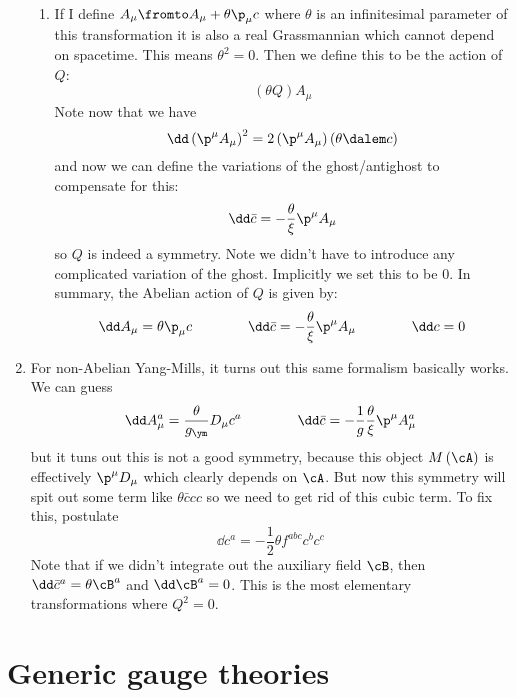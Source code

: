 \documentclass{booc}
\begin{document}
\begin{enumerate}
\begin{enumerate}
\item If I define $A_\mu \fromto A_\mu + \theta \p_\mu c$
where $\theta$ is an infinitesimal parameter of this transformation
it is also a real Grassmannian which cannot depend on spacetime. 
This means $\theta^2 = 0$.
Then we define this to be the action of $Q$:
\begin{equation}
\left( \theta Q \right) A_\mu
\end{equation}
Note now that we have
\begin{equation}
\dd\left( \p^\mu A_\mu \right)^2 = 
2\left( \p^\mu A_\mu \right)\left( \theta \dalem c \right)
\end{equation}
and now we can define the variations of the ghost/antighost to compensate for this:
\begin{equation}
\dd \bar c = - \frac{\theta}{\xi} \p^\mu A_\mu
\end{equation}
so $Q$ is indeed a symmetry. Note we didn't have to introduce any complicated variation of the ghost. 
Implicitly we set this to be $0$. 
In summary, the Abelian action of $Q$ is given by:
\begin{eqnarray}
\dd A_\mu =  \theta \p_\mu c 
\qquad\qquad
\dd\bar c = -\frac{\theta}{\xi} \p^\mu A_\mu 
\qquad\qquad
\dd c = 0
\end{eqnarray}
\end{enumerate}
\item
For non-Abelian Yang-Mills, it turns out this same formalism basically works. 
We can guess
\begin{eqnarray}
\dd A_\mu^a =  \frac{\theta}{g_\ym}
D_\mu c^a 
\qquad\qquad
\dd \bar c = -\frac{1}{g}\frac{\theta}{\xi}
\p^\mu A_\mu^a
\end{eqnarray}
but it tuns out this is not a good symmetry, because this object $M\left( \cA \right)$
is effectively $\p^\mu D_\mu$ which clearly depends on $\cA$. 
But now this symmetry will spit out some term like $\theta \bar c c c$ so we need to get rid 
of this cubic term. To fix this, postulate
\begin{equation}
\dd c^a = - \frac{1}{2} \theta f^{abc} c^b c^c
\end{equation}
Note that if we didn't integrate out the auxiliary field $\cB$, 
then $\dd \bar c^a = \theta \cB^a$ and $\dd\cB^a = 0$. 
This is the most elementary transformations where $Q^2 = 0$. 
\end{enumerate}

\chapter{Generic gauge theories}
\end{document}
